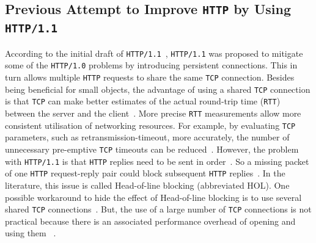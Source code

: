 \documentclass[12pt,a4paper]{report}
\begin{document}
\subsection{Previous Attempt to Improve \texttt{HTTP} by Using \texttt{HTTP/1.1}}

According to the initial draft of \texttt{HTTP/1.1}~\cite{RFC2068}, \texttt{HTTP/1.1} was proposed to mitigate some of the \texttt{HTTP/1.0} problems by introducing persistent connections.
This in turn allows multiple \texttt{HTTP} requests to share the same \texttt{TCP} connection.
Besides being beneficial for small objects, the advantage of using a shared \texttt{TCP} connection is that \texttt{TCP} can make better estimates of the actual round-trip time (\texttt{RTT}) between the server and the client~\cite{bib_Computer_Networking_L6}.
More precise \texttt{RTT} measurements allow more consistent utilisation of networking resources.
For example, by evaluating \texttt{TCP} parameters, such as retransmission-timeout, more accurately, the number of unnecessary pre-emptive \texttt{TCP} timeouts can be reduced~\cite{bib_rtt_tcp_Retransmissions}.
However, the problem with \texttt{HTTP/1.1} is that \texttt{HTTP} replies need to be sent in order~\cite{RFC7540}. 
So a missing packet of one \texttt{HTTP} request-reply pair could block subsequent \texttt{HTTP} replies~\cite{bib_digital_ocean_http11_vs_http2, head-of-line-blocking-in-quic-and-http-3-the-details}.
In the literature, this issue is called Head-of-line blocking (abbreviated HOL).
One possible workaround to hide the effect of Head-of-line blocking is to use several shared \texttt{TCP} connections~\cite{bib_digital_ocean_http11_vs_http2}.
But, the use of a large number of \texttt{TCP} connections is not practical because there is an associated performance overhead of opening and using them ~\cite{bib_digital_ocean_http11_vs_http2, head-of-line-blocking-in-quic-and-http-3-the-details}.
\end{document}

